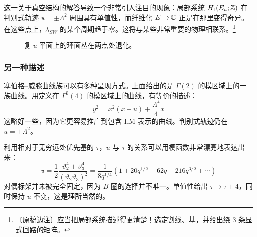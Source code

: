 
这一关于真空结构的解答导致一个非常引人注目的现象：局部系统 $H_{1}(E_{u};\mathbb{Z})$ 在判别式轨迹 $u=\pm\Lambda^{2}$ 周围具有单值性，而纤维化 $E\to\mathbb{C}$ 正是在那里变得奇异。在这些点上，$\lambda_{SW}$ 的某个周期趋于零。这将与某些非常重要的物理相联系。\footnote{〔原稿边注〕应当把局部系统描述得更清楚！选定割线、基，并给出绕 3 条显式回路的矩阵。}

\begin{figure}[H]
  \centering
  \caption{复 $u$ 平面上的环面丛在两点处退化。}
  \label{fig:torifibration}
\end{figure}

\subsubsection{另一种描述}

塞伯格--威滕曲线族可以有多种呈现方式。上面给出的是 $\Gamma(2)$ 的模区域上的一族曲线。用定义在 $\Gamma^{0}(4)$ 的模区域上的曲线，有等价的描述：
\begin{equation}
y^{2}=x^{2}(x-u)+\frac{\Lambda^{4}}{4}x
\tag{5.40}
\end{equation}
这略好一些，因为它更容易推广到包含 HM 表示的曲线。判别式轨迹仍在 $u=\pm\Lambda^{2}$。

利用相对于无穷远处优先基的 $\tau$，$u$ 与 $\tau$ 的关系可以用模函数非常漂亮地表达出来：
\begin{equation}
u=\frac{1}{2}\frac{\vartheta_{2}^{4}+\vartheta_{3}^{4}}{(\vartheta_{2}\vartheta_{3})^{2}}
=\frac{1}{8q^{1/4}}\left(1+20q^{1/2}-62q+216q^{3/2}+\cdots\right)
\tag{5.41}
\end{equation}
对偶标架并未被完全固定，因为 $B$-圈的选择并不唯一。单值性给出 $\tau\to\tau+4$，同时保持 $u$ 不变，这是理所当然的。

